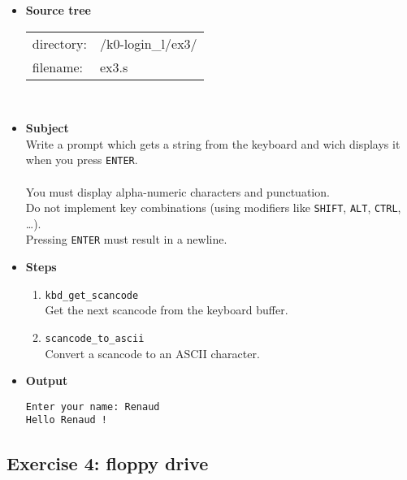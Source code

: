 {\begin{itemize}
\item {\bf Source tree}\\
\begin{tabular}{p{4cm}l}
directory: & /k0-login\_l/ex3/\\
filename: & ex3.s
\end{tabular}
\\
\item {\bf Subject}\\
Write a prompt which gets a string from the keyboard and wich displays it when you press {\tt ENTER}.\\
\\
You must display alpha-numeric characters and punctuation.\\
Do not implement key combinations (using modifiers like {\tt SHIFT}, {\tt ALT}, {\tt CTRL}, \ldots).\\
Pressing {\tt ENTER} must result in a newline.\\
\item {\bf Steps}
  \begin{enumerate}
  \item {\tt kbd\_get\_scancode}\\
  Get the next scancode from the keyboard buffer.
  \item {\tt scancode\_to\_ascii}\\
  Convert a scancode to an ASCII character.
\\
  \end{enumerate}
\item {\bf Output}
\begin{verbatim}
Enter your name: Renaud
Hello Renaud !
\end{verbatim}
\end{itemize}

\newpage

\subsection*{Exercise 4: floppy drive}

}
